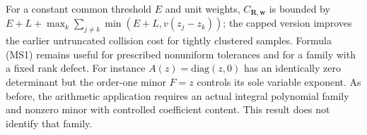 For a constant common threshold \(E\) and unit weights,
\(C_{\mathbf R,\mathbf w}\) is bounded by
\(E+L+\max_k\sum_{j\ne k}\min(E+L,v(z_j-z_k))\);
the capped version improves the earlier untruncated collision
cost for tightly clustered samples. Formula (MS1) remains
useful for prescribed nonuniform tolerances and for a family
with a fixed rank defect. For instance \(A(z)=\mathrm{diag}(z,0)\)
has an identically zero determinant but the order-one minor
\(F=z\) controls its sole variable exponent.
As before, the arithmetic application requires an actual
integral polynomial family and nonzero minor with controlled
coefficient content. This result does not identify that family.

